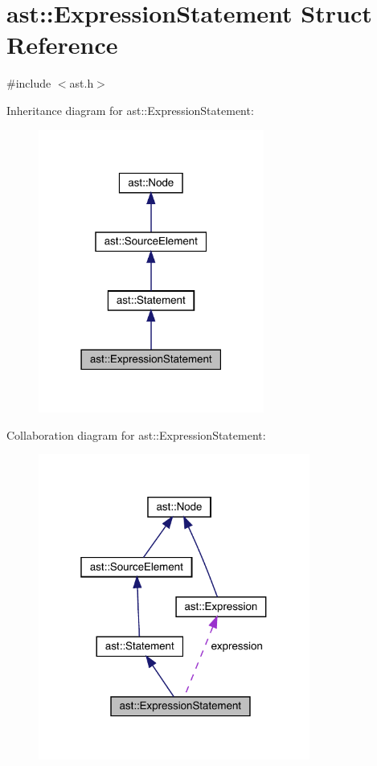 \hypertarget{structast_1_1_expression_statement}{}\section{ast\+:\+:Expression\+Statement Struct Reference}
\label{structast_1_1_expression_statement}


{\ttfamily \#include $<$ast.\+h$>$}



Inheritance diagram for ast\+:\+:Expression\+Statement\+:\nopagebreak
\begin{figure}[H]
\begin{center}
\leavevmode
\includegraphics[width=210pt]{structast_1_1_expression_statement__inherit__graph}
\end{center}
\end{figure}


Collaboration diagram for ast\+:\+:Expression\+Statement\+:\nopagebreak
\begin{figure}[H]
\begin{center}
\leavevmode
\includegraphics[width=253pt]{structast_1_1_expression_statement__coll__graph}
\end{center}
\end{figure}
